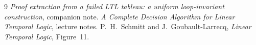 \documentclass[11pt,a4paper]{article}
\theoremstyle{definition}
\begin{document}
\begin{thebibliography}{9}
 \emph{Proof extraction from a failed LTL tableau: a uniform
loop-invariant construction}, companion note.
 \emph{A Complete Decision Algorithm for Linear Temporal Logic},
lecture notes.
 P.~H.~Schmitt and J.~Goubault-Larrecq, \emph{Linear Temporal
Logic}, Figure~11.
\end{thebibliography}
\end{document}
